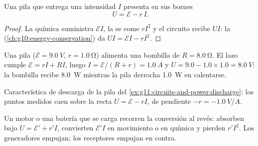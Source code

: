 \begin{proposition}\label{prop:g11:circuits-and-power:terminal}
Una pila que entrega una intensidad $I$ presenta en sus bornes
\[ U = \mathcal{E} - r\,I . \]
\end{proposition}

\begin{proof}
La química suministra $\mathcal{E}I$, la  se come
$rI^2$ y el circuito recibe $UI$: la 
(\cref{ch:g10:energy-conservation}) da $UI = \mathcal{E}I - rI^2$.
\end{proof}

\begin{example}\label{ex:g11:circuits-and-power:discharge}
Una pila ($\mathcal{E} = \qty{9.0}{V}$, $r = \qty{1.0}{\ohm}$) alimenta
una bombilla de  $R = \qty{8.0}{\ohm}$. El lazo cumple
$\mathcal{E} = rI + RI$, luego $I = \mathcal{E}/(R + r) = \qty{1.0}{A}$
y $U = 9.0 - 1.0 \times 1.0 = \qty{8.0}{V}$: la bombilla recibe
\qty{8.0}{W} mientras la pila derrocha \qty{1.0}{W} en calentarse.
\end{example}

\begin{omfigure}

{\small Característica de descarga de la pila del
\cref{ex:g11:circuits-and-power:discharge}: los puntos medidos caen
sobre la recta $U = \mathcal{E} - rI$, de pendiente
$-r = \qty{-1.0}{V/A}$.}
\end{omfigure}

\begin{remark}\label{rem:g11:circuits-and-power:receivers}
Un motor o una batería que se carga recorren la conversión al revés:
absorben bajo $U = \mathcal{E}' + r'I$, convierten $\mathcal{E}'I$ en
movimiento o en química y pierden $r'I^2$. Los generadores empujan; los
receptores empujan en contra.
\end{remark}

